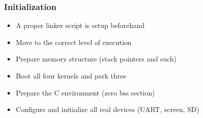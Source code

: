 \documentclass[table,xcdraw]{beamer}
\begin{document}
\begin{frame}[fragile]
    \frametitle{Initialization}
    \begin{itemize}
        \item A proper linker script is setup beforehand
        \item Move to the correct level of execution
        \item Prepare memory structure (stack pointers and such)
        \item Boot all four kernels and park three
        \item Prepare the C environment (zero bss section)
        \item Configure and initialize all real devices (UART, screen, SD)
    \end{itemize}

\end{frame}
\end{document}
